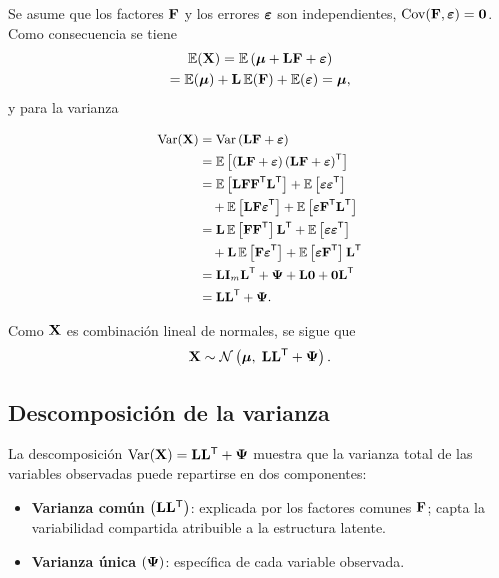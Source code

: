 Se asume que los factores $\vb{F}$ y los errores $\epsb$ son independientes,
$\Cov(\vb{F},\epsb)=\mat{0}$. Como consecuencia se tiene
\begin{multline}
  \label{eq:esperanza_X_es}
  \E(\vb{X})=\E\qty{\mub+\mat{L}\vb{F}+\epsb}\\
  =\E(\mub)+\mat{L}\,\E(\vb{F})+\E(\epsb)=\mub,
\end{multline}
y para la varianza

\begin{equation}
  \label{eq:varianza_X_es}
  \small
  \begin{aligned}
    \Var(\vb{X})
      &=\Var\qty{\mat{L}\vb{F}+\epsb}\\
      &=\E\sqty{\qty{\mat{L}\vb{F}+\epsb}
                \qty{\mat{L}\vb{F}+\epsb}^\tp}\\
      &=\E\sqty{\mat{L}\vb{F}\vb{F}^\tp\mat{L}^\tp}
        +\E\sqty{\epsb\epsb^\tp}\\
      &\quad+\E\sqty{\mat{L}\vb{F}\epsb^\tp}
        +\E\sqty{\epsb\vb{F}^\tp\mat{L}^\tp}\\
      &=\mat{L}\,\E\sqty{\vb{F}\vb{F}^\tp}\mat{L}^\tp
        +\E\sqty{\epsb\epsb^\tp}\\
      &\quad+\mat{L}\,\E\sqty{\vb{F}\epsb^\tp}
        +\E\sqty{\epsb\vb{F}^\tp}\mat{L}^\tp\\
      &=\mat{L}\I_m\mat{L}^\tp+\Psib
        +\mat{L}\mat{0}+\mat{0}\mat{L}^\tp\\
      &=\mat{L}\mat{L}^\tp+\Psib.
  \end{aligned}
\end{equation}

Como $\vb{X}$ es combinaci\'on lineal de normales, se sigue que
\begin{equation}
  \label{eq:distribucion_X_es}
  \vb{X}\sim\normal\qty{\mub,\;\mat{L}\mat{L}^\tp+\Psib}.
\end{equation}

\subsection{Descomposici\'on de la varianza}
\label{subsec:descomposicion_varianza}

La descomposici\'on $\Var(\vb{X})=\mat{L}\mat{L}^\tp+\Psib$ muestra que la
varianza total de las variables observadas puede repartirse en dos componentes:
\begin{itemize}
  \item \textbf{Varianza com\'un} $\qty{\mat{L}\mat{L}^\tp}$: explicada por los
        factores comunes $\vb{F}$; capta la variabilidad compartida atribuible
        a la estructura latente.
  \item \textbf{Varianza \'unica} $\qty{\Psib}$: espec\'ifica de cada variable
        observada.
\end{itemize}

